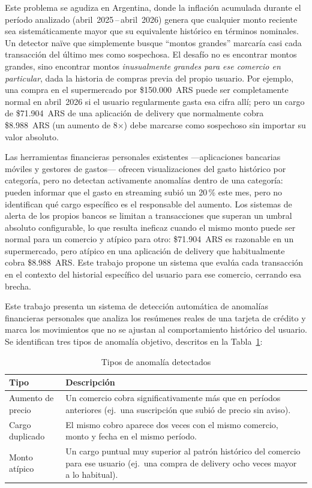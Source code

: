 \documentclass[conference]{IEEEtran}
\begin{document}
Este problema se agudiza en Argentina, donde la inflaci\'on acumulada durante el
per\'iodo analizado (abril~2025\,--\,abril~2026) genera que cualquier monto reciente
sea sistem\'aticamente mayor que su equivalente hist\'orico en t\'erminos nominales.
Un detector na\"ive que simplemente busque ``montos grandes'' marcar\'ia casi cada
transacci\'on del \'ultimo mes como sospechosa. El desaf\'io no es encontrar montos
grandes, sino encontrar montos \emph{inusualmente grandes para ese comercio en
particular}, dada la historia de compras previa del propio usuario. Por ejemplo,
una compra en el supermercado por \$150.000~ARS puede ser completamente normal en
abril~2026 si el usuario regularmente gasta esa cifra all\'i; pero un cargo de
\$71.904~ARS de una aplicaci\'on de delivery que normalmente cobra \$8.988~ARS
(un aumento de 8$\times$) debe marcarse como sospechoso sin importar su valor
absoluto.

Las herramientas financieras personales existentes ---aplicaciones bancarias m\'oviles
y gestores de gastos--- ofrecen visualizaciones del gasto hist\'orico por categor\'ia,
pero no detectan activamente anomal\'ias dentro de una categor\'ia: pueden informar
que el gasto en streaming subi\'o un 20\,\% este mes, pero no identifican qu\'e cargo
espec\'ifico es el responsable del aumento. Los sistemas de alerta de los propios
bancos se limitan a transacciones que superan un umbral absoluto configurable, lo que
resulta ineficaz cuando el mismo monto puede ser normal para un comercio y at\'ipico
para otro: \$71.904~ARS es razonable en un supermercado, pero at\'ipico en una
aplicaci\'on de delivery que habitualmente cobra \$8.988~ARS. Este trabajo propone
un sistema que eval\'ua cada transacci\'on en el contexto del historial espec\'ifico
del usuario para ese comercio, cerrando esa brecha.

Este trabajo presenta un sistema de detecci\'on autom\'atica de anomal\'ias
financieras personales que analiza los res\'umenes reales de una tarjeta de cr\'edito
y marca los movimientos que no se ajustan al comportamiento hist\'orico del usuario.
Se identifican tres tipos de anomal\'ia objetivo, descritos en la
Tabla~\ref{tab:anomaly-types}:

\begin{table}[h]
\caption{Tipos de anomal\'ia detectados}
\label{tab:anomaly-types}
\centering
\begin{tabular}{p{1.6cm}p{5.8cm}}
\toprule
\textbf{Tipo} & \textbf{Descripci\'on} \\
\midrule
Aumento de precio & Un comercio cobra significativamente m\'as que en per\'iodos
anteriores (ej.\ una suscripci\'on que subi\'o de precio sin aviso). \\
\addlinespace
Cargo duplicado & El mismo cobro aparece dos veces con el mismo comercio, monto y
fecha en el mismo per\'iodo. \\
\addlinespace
Monto at\'ipico & Un cargo puntual muy superior al patr\'on hist\'orico del comercio
para ese usuario (ej.\ una compra de delivery ocho veces mayor a lo habitual). \\
\bottomrule
\end{tabular}
\end{table}
\end{document}
